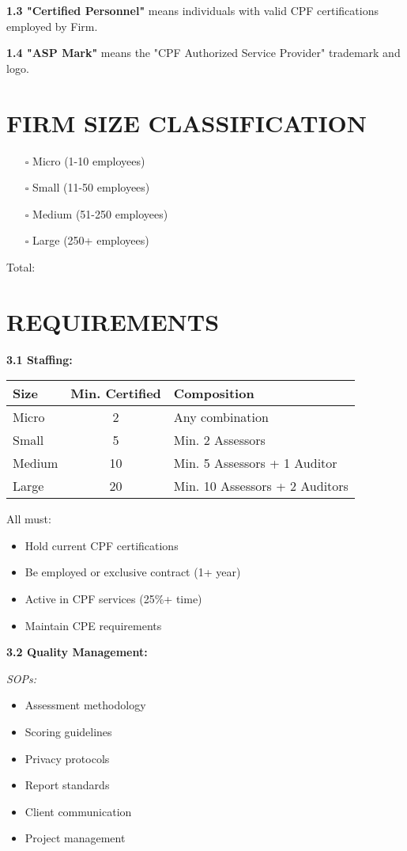 \documentclass[11pt,a4paper]{article}
\begin{document}
\textbf{1.3 "Certified Personnel"} means individuals with valid CPF certifications employed by Firm.

\textbf{1.4 "ASP Mark"} means the "CPF Authorized Service Provider" trademark and logo.

\section{FIRM SIZE CLASSIFICATION}

\begin{itemize}
\item[$\square$] Micro (1-10 employees)
\item[$\square$] Small (11-50 employees)
\item[$\square$] Medium (51-250 employees)
\item[$\square$] Large (250+ employees)
\end{itemize}

Total: \underline{\hspace{4cm}}

\section{REQUIREMENTS}

\textbf{3.1 Staffing:}

\begin{tabular}{|l|c|p{5cm}|}
\hline
Size & Min. Certified & Composition \\
\hline
Micro & 2 & Any combination \\
Small & 5 & Min. 2 Assessors \\
Medium & 10 & Min. 5 Assessors + 1 Auditor \\
Large & 20 & Min. 10 Assessors + 2 Auditors \\
\hline
\end{tabular}

All must:
\begin{itemize}
\item Hold current CPF certifications
\item Be employed or exclusive contract (1+ year)
\item Active in CPF services (25\%+ time)
\item Maintain CPE requirements
\end{itemize}

\textbf{3.2 Quality Management:}

\textit{SOPs:}
\begin{itemize}
\item Assessment methodology
\item Scoring guidelines
\item Privacy protocols
\item Report standards
\item Client communication
\item Project management
\end{itemize}
\end{document}
